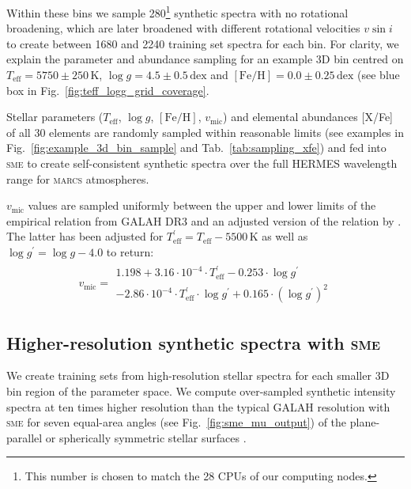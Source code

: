 \documentclass[
  journal=pasa,
  manuscript=research-paper, %
  year=2024,
  volume=37
]{cup-journal}
\newcommand{\Teff}{$T_\mathrm{eff}$\xspace}
\newcommand{\logg}{$\log g$\xspace}
\newcommand{\feh}{$\mathrm{[Fe/H]}$\xspace}
\newcommand{\vmic}{$v_\mathrm{mic}$\xspace}
\newcommand{\vsini}{$v \sin i$\xspace}
\newcommand{\sme}{\textsc{sme}\xspace}
\newcommand{\marcs}{\textsc{marcs}\xspace}
\newcommand{\dex}{\,\mathrm{dex}}	%
\newcommand{\K}{\,\mathrm{K}}	%
\begin{document}
Within these bins we sample 280\footnote{This number is chosen to match the 28 CPUs of our computing nodes.} synthetic spectra with no rotational broadening, which are later broadened with different rotational velocities \vsini to create between 1680 and 2240 training set spectra for each bin. For clarity, we explain the parameter and abundance sampling for an example 3D bin centred on $T_\text{eff} = 5750\pm250\K$, $\log g = 4.5\pm0.5\dex$ and $\mathrm{[Fe/H]} = 0.0\pm0.25\dex$ (see blue box in Fig.~\ref{fig:teff_logg_grid_coverage}.

Stellar parameters (\Teff, \logg, \feh, \vmic) and elemental abundances [X/Fe] of all 30 elements are randomly sampled within reasonable limits (see examples in Fig.~\ref{fig:example_3d_bin_sample} and Tab.~\ref{tab:sampling_xfe}) and fed into \sme to create self-consistent synthetic spectra over the full HERMES wavelength range for \marcs atmospheres. 

\vmic values are sampled uniformly between the upper and lower limits of the empirical relation from GALAH DR3 \citep[Eqs.~4 and 5 from][]{Buder2021} and an adjusted version of the relation by \citet{DutraFerreira2016}. The latter has been adjusted for $T_\text{eff}^\prime = T_\text{eff} - 5500\,\mathrm{K}$ as well as $\log g^\prime = \log g - 4.0$ to return:
\begin{align} 
v_\text{mic} = \begin{array}{l}
1.198 + 3.16 \cdot 10^{-4} \cdot T_\text{eff}^\prime - 0.253 \cdot \log g^\prime \\ - 2.86\cdot 10^{-4} \cdot T_\text{eff}^\prime \cdot \log g^\prime + 0.165 \cdot (\log g^\prime)^2
\end{array} \label{eq:vmic_initial}
\end{align}

\subsection{Higher-resolution synthetic spectra with \sme}
\label{sec:higher_resolution_synthetic_spectra}

We create training sets from high-resolution stellar spectra for each smaller 3D bin region of the parameter space. We compute over-sampled synthetic intensity spectra at ten times higher resolution than the typical GALAH resolution with \sme for seven equal-area angles (see Fig.~\ref{fig:sme_mu_output}) of the plane-parallel or spherically symmetric stellar surfaces \citep{Gustafsson2008}.
\end{document}
